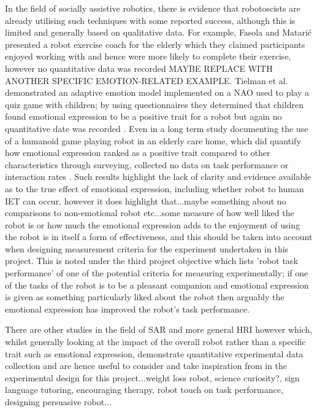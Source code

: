 \documentclass[11pt]{article}
\begin{document}
In the field of socially assistive robotics, there is evidence that robotoscists are already utilising such techniques with some reported success, although this is limited and generally based on qualitative data. For example, Fasola and Matari{\'c} presented a robot exercise coach for the elderly which they claimed participants enjoyed working with and hence were more likely to complete their exercise, however no quantitative data was recorded \cite{fasola2010robot} MAYBE REPLACE WITH ANOTHER SPECIFIC EMOTION-RELATED EXAMPLE. Tielman et al. demonstrated an adaptive emotion model implemented on a NAO used to play a quiz game with children; by using questionnaires they determined that children found emotional expression to be a positive trait for a robot but again no quantitative date was recorded \cite{tielman2014adaptive}. Even in a long term study documenting the use of a humanoid game playing robot in an elderly care home, which did quantify how emotional expression ranked as a positive trait compared to other characteristics through surveying, collected no data on task performance or interaction rates \cite{louie2012playing}. Such results highlight the lack of clarity and evidence available as to the true effect of emotional expression, including whether robot to human IET can occur, however it does highlight that...maybe something about no comparisons to non-emotional robot etc...some measure of how well liked the robot is or how much the emotional expression adds to the enjoyment of using the robot is in itself a form of effectiveness, and this should be taken into account when designing measurement criteria for the experiment undertaken in this project. This is noted under the third project objective which lists 'robot task performance' of one of the potential criteria for measuring experimentally; if one of the tasks of the robot is to be a pleasant companion and emotional expression is given as something particularly liked about the robot then arguably the emotional expression has improved the robot's task performance.  

There are other studies in the field of SAR and more general HRI however which, whilst generally looking at the impact of the overall robot rather than a specific trait such as emotional expression, demonstrate quantitative experimental data collection and are hence useful to consider and take inspiration from in the experimental design for this project...weight loss robot, science curiosity?, sign language tutoring, encouraging therapy, robot touch on task performance, designing persuasive robot...
\end{document}
